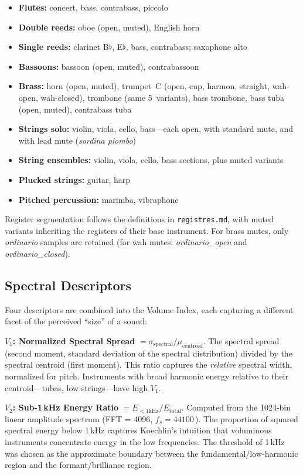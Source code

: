 \documentclass[journal]{IEEEtran}
\newcommand{\Hz}{\,\text{Hz}}
\begin{document}
\begin{itemize}[nosep]
\item \textbf{Flutes:} concert, bass, contrabass, piccolo
\item \textbf{Double reeds:} oboe (open, muted), English horn
\item \textbf{Single reeds:} clarinet B$\flat$, E$\flat$, bass, contrabass; saxophone alto
\item \textbf{Bassoons:} bassoon (open, muted), contrabassoon
\item \textbf{Brass:} horn (open, muted), trumpet~C (open, cup, harmon, straight, wah-open, wah-closed), trombone (same 5~variants), bass trombone, bass tuba (open, muted), contrabass tuba
\item \textbf{Strings solo:} violin, viola, cello, bass---each open, with standard mute, and with lead mute (\textit{sordina piombo})
\item \textbf{String ensembles:} violin, viola, cello, bass sections, plus muted variants
\item \textbf{Plucked strings:} guitar, harp
\item \textbf{Pitched percussion:} marimba, vibraphone
\end{itemize}

Register segmentation follows the definitions in \texttt{registres.md}, with muted variants inheriting the registers of their base instrument. For brass mutes, only \textit{ordinario} samples are retained (for wah mutes: \textit{ordinario\_open} and \textit{ordinario\_closed}).

\subsection{Spectral Descriptors}

Four descriptors are combined into the Volume Index, each capturing a different facet of the perceived ``size'' of a sound:

\textbf{$V_1$: Normalized Spectral Spread} $= \sigma_\text{spectral} / \mu_\text{centroid}$. The spectral spread (second moment, standard deviation of the spectral distribution) divided by the spectral centroid (first moment). This ratio captures the \emph{relative} spectral width, normalized for pitch. Instruments with broad harmonic energy relative to their centroid---tubas, low strings---have high $V_1$.

\textbf{$V_2$: Sub-1\,kHz Energy Ratio} $= E_{<1\text{kHz}} / E_\text{total}$. Computed from the 1024-bin linear amplitude spectrum (FFT = 4096, $f_s = 44100$\Hz). The proportion of squared spectral energy below 1\,kHz captures Koechlin's intuition that voluminous instruments concentrate energy in the low frequencies. The threshold of 1\,kHz was chosen as the approximate boundary between the fundamental/low-harmonic region and the formant/brilliance region.
\end{document}
